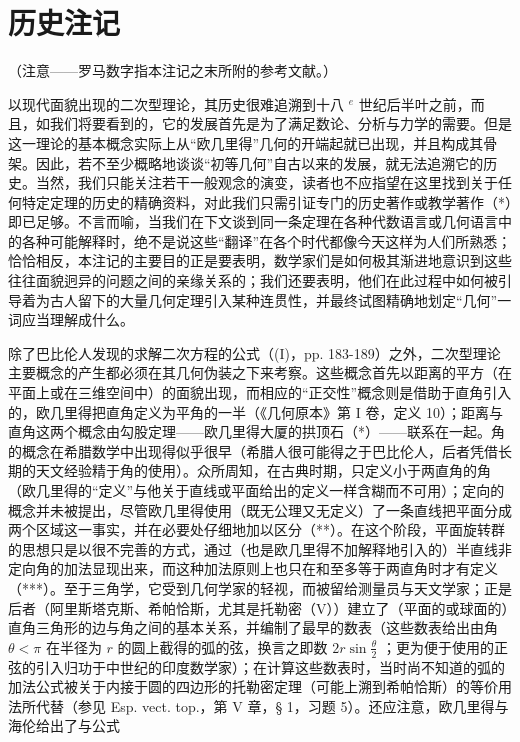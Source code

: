 \chapter*{历史注记}
{}

（注意——罗马数字指本注记之末所附的参考文献。）

以现代面貌出现的二次型理论，其历史很难追溯到十八 \(^{e}\) 世纪后半叶之前，而且，如我们将要看到的，它的发展首先是为了满足数论、分析与力学的需要。但是这一理论的基本概念实际上从“欧几里得”几何的开端起就已出现，并且构成其骨架。因此，若不至少概略地谈谈“初等几何”自古以来的发展，就无法追溯它的历史。当然，我们只能关注若干一般观念的演变，读者也不应指望在这里找到关于任何特定定理的历史的精确资料，对此我们只需引证专门的历史著作或教学著作（*）即已足够。不言而喻，当我们在下文谈到同一条定理在各种代数语言或几何语言中的各种可能解释时，绝不是说这些“翻译”在各个时代都像今天这样为人们所熟悉；恰恰相反，本注记的主要目的正是要表明，数学家们是如何极其渐进地意识到这些往往面貌迥异的问题之间的亲缘关系的；我们还要表明，他们在此过程中如何被引导着为古人留下的大量几何定理引入某种连贯性，并最终试图精确地划定“几何”一词应当理解成什么。

除了巴比伦人发现的求解二次方程的公式（(I)，pp. 183-189）之外，二次型理论主要概念的产生都必须在其几何伪装之下来考察。这些概念首先以距离的平方（在平面上或在三维空间中）的面貌出现，而相应的“正交性”概念则是借助于直角引入的，欧几里得把直角定义为平角的一半（《几何原本》第 I 卷，定义 10）；距离与直角这两个概念由勾股定理——欧几里得大厦的拱顶石（*）——联系在一起。角的概念在希腊数学中出现得似乎很早（希腊人很可能得之于巴比伦人，后者凭借长期的天文经验精于角的使用）。众所周知，在古典时期，只定义小于两直角的角（欧几里得的“定义”与他关于直线或平面给出的定义一样含糊而不可用）；定向的概念并未被提出，尽管欧几里得使用（既无公理又无定义）了一条直线把平面分成两个区域这一事实，并在必要处仔细地加以区分（**）。在这个阶段，平面旋转群的思想只是以很不完善的方式，通过（也是欧几里得不加解释地引入的）半直线非定向角的加法显现出来，而这种加法原则上也只在和至多等于两直角时才有定义（***）。至于三角学，它受到几何学家的轻视，而被留给测量员与天文学家；正是后者（阿里斯塔克斯、希帕恰斯，尤其是托勒密（V））建立了（平面的或球面的）直角三角形的边与角之间的基本关系，并编制了最早的数表（这些数表给出由角 \(\theta < \pi\) 在半径为 \(r\) 的圆上截得的弧的弦，换言之即数 \(2r \sin \frac{\theta}{2}\) ；更为便于使用的正弦的引入归功于中世纪的印度数学家）；在计算这些数表时，当时尚不知道的弧的加法公式被关于内接于圆的四边形的托勒密定理（可能上溯到希帕恰斯）的等价用法所代替（参见 Esp. vect. top.，第 V 章，§ 1，习题 5）。还应注意，欧几里得与海伦给出了与公式

